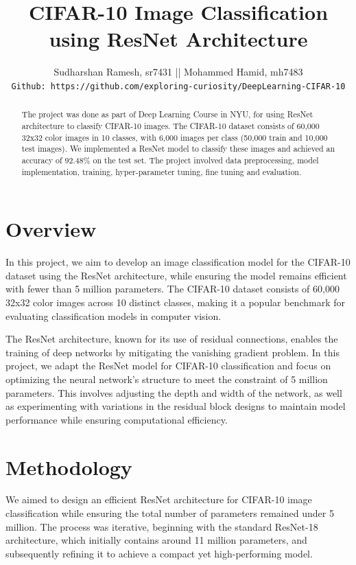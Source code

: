 \documentclass[twoside, 11pt]{article}
\begin{document}
\title{CIFAR-10 Image Classification using ResNet Architecture}
\author{Sudharshan Ramesh, sr7431 || 
Mohammed Hamid, mh7483\\
\texttt{Github: https://github.com/exploring-curiosity/DeepLearning-CIFAR-10}}
\maketitle

\begin{abstract}

    The project was done as part of Deep Learning Course in NYU, for using ResNet architecture to classify CIFAR-10 images. The CIFAR-10 dataset consists of 60,000 32x32 color images in 10 classes, with 6,000 images per class (50,000 train and 10,000 test images). We implemented a ResNet model to classify these images and achieved an accuracy of 92.48\% on the test set. The project involved data preprocessing, model implementation, training, hyper-parameter tuning, fine tuning and evaluation.
\end{abstract}

\section{Overview}
\label{sec:intro}
In this project, we aim to develop an image classification model for the CIFAR-10 dataset using the ResNet architecture, while ensuring the model remains efficient with fewer than 5 million parameters. The CIFAR-10 dataset consists of 60,000 32x32 color images across 10 distinct classes, making it a popular benchmark for evaluating classification models in computer vision.

The ResNet architecture, known for its use of residual connections, enables the training of deep networks by mitigating the vanishing gradient problem. In this project, we adapt the ResNet model for CIFAR-10 classification and focus on optimizing the neural network’s structure to meet the constraint of 5 million parameters. This involves adjusting the depth and width of the network, as well as experimenting with variations in the residual block designs to maintain model performance while ensuring computational efficiency.

\section{Methodology}
\label{sec:method}
We aimed to design an efficient ResNet architecture for CIFAR-10 image classification while ensuring the total number of parameters remained under 5 million. The process was iterative, beginning with the standard ResNet-18 architecture, which initially contains around 11 million parameters, and subsequently refining it to achieve a compact yet high-performing model.
\end{document}
